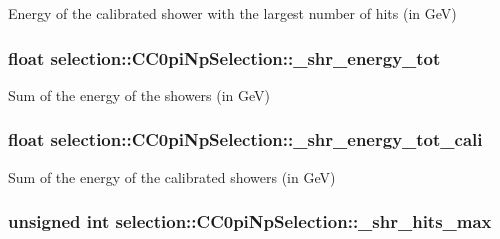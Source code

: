 Energy of the calibrated shower with the largest number of hits (in Ge\-V) \hypertarget{classselection_1_1CC0piNpSelection_a6e42f011e79f646f36df7148907d1b59}{
\subsubsection[{\-\_\-shr\-\_\-energy\-\_\-tot}]{\setlength{\rightskip}{0pt plus 5cm}float selection\-::\-C\-C0pi\-Np\-Selection\-::\-\_\-shr\-\_\-energy\-\_\-tot\hspace{0.3cm}{\ttfamily [private]}}}\label{classselection_1_1CC0piNpSelection_a6e42f011e79f646f36df7148907d1b59}
Sum of the energy of the showers (in Ge\-V) \hypertarget{classselection_1_1CC0piNpSelection_aae69f88600d31bb3456808268fb63c1c}{
\subsubsection[{\-\_\-shr\-\_\-energy\-\_\-tot\-\_\-cali}]{\setlength{\rightskip}{0pt plus 5cm}float selection\-::\-C\-C0pi\-Np\-Selection\-::\-\_\-shr\-\_\-energy\-\_\-tot\-\_\-cali\hspace{0.3cm}{\ttfamily [private]}}}\label{classselection_1_1CC0piNpSelection_aae69f88600d31bb3456808268fb63c1c}
Sum of the energy of the calibrated showers (in Ge\-V) \hypertarget{classselection_1_1CC0piNpSelection_a750834ef52299d85f9596bbbafa1dffb}{
\subsubsection[{\-\_\-shr\-\_\-hits\-\_\-max}]{\setlength{\rightskip}{0pt plus 5cm}unsigned int selection\-::\-C\-C0pi\-Np\-Selection\-::\-\_\-shr\-\_\-hits\-\_\-max\hspace{0.3cm}{\ttfamily [private]}}}\label{classselection_1_1CC0piNpSelection_a750834ef52299d85f9596bbbafa1dffb}
